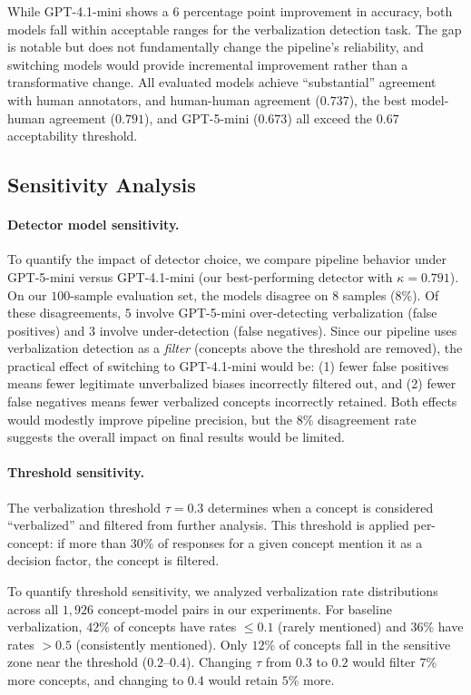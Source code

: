While GPT-4.1-mini shows a $6$ percentage point improvement in accuracy, both models fall within acceptable ranges for the verbalization detection task. The gap is notable but does not fundamentally change the pipeline's reliability, and switching models would provide incremental improvement rather than a transformative change. All evaluated models achieve ``substantial'' agreement with human annotators, and human-human agreement ($0.737$), the best model-human agreement ($0.791$), and GPT-5-mini ($0.673$) all exceed the $0.67$ acceptability threshold.

\subsection{Sensitivity Analysis}

\paragraph{Detector model sensitivity.} To quantify the impact of detector choice, we compare pipeline behavior under GPT-5-mini versus GPT-4.1-mini (our best-performing detector with $\kappa = 0.791$). On our $100$-sample evaluation set, the models disagree on $8$ samples ($8$\%). Of these disagreements, $5$ involve GPT-5-mini over-detecting verbalization (false positives) and $3$ involve under-detection (false negatives). Since our pipeline uses verbalization detection as a \emph{filter} (concepts above the threshold are removed), the practical effect of switching to GPT-4.1-mini would be: (1) fewer false positives means fewer legitimate unverbalized biases incorrectly filtered out, and (2) fewer false negatives means fewer verbalized concepts incorrectly retained. Both effects would modestly improve pipeline precision, but the $8$\% disagreement rate suggests the overall impact on final results would be limited.

\paragraph{Threshold sensitivity.} The verbalization threshold $\tau = 0.3$ determines when a concept is considered ``verbalized'' and filtered from further analysis. This threshold is applied per-concept: if more than 30\% of responses for a given concept mention it as a decision factor, the concept is filtered.

To quantify threshold sensitivity, we analyzed verbalization rate distributions across all $1{,}926$ concept-model pairs in our experiments. For baseline verbalization, $42$\% of concepts have rates $\leq$$0.1$ (rarely mentioned) and $36$\% have rates $>$$0.5$ (consistently mentioned). Only $12$\% of concepts fall in the sensitive zone near the threshold ($0.2$--$0.4$). Changing $\tau$ from $0.3$ to $0.2$ would filter $7$\% more concepts, and changing to $0.4$ would retain $5$\% more.

